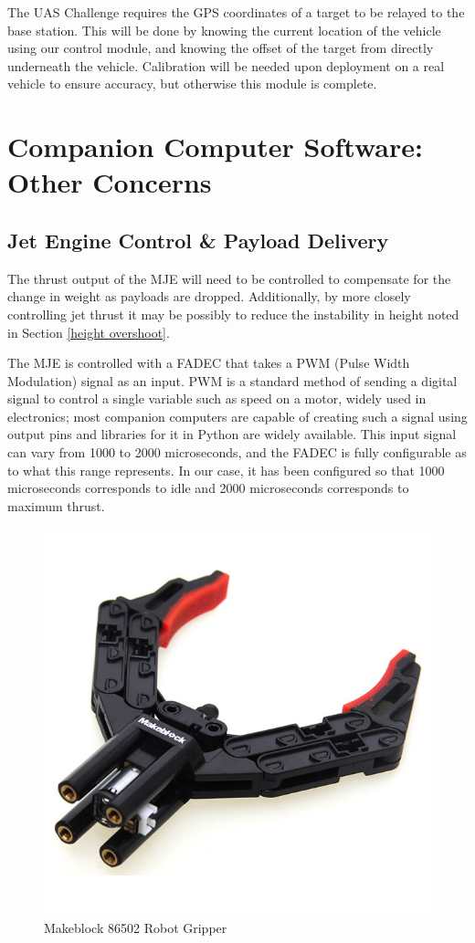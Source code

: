 \documentclass[11pt]{article}
\begin{document}
The UAS Challenge requires the GPS coordinates of a target to be relayed to the base station. This will be done by knowing the current location of the vehicle using our control module, and knowing the offset of the target from directly underneath the vehicle. Calibration will be needed upon deployment on a real vehicle to ensure accuracy, but otherwise this module is complete.

\section{Companion Computer Software: Other Concerns}
\subsection{Jet Engine Control \& Payload Delivery}
The thrust output of the MJE will need to be controlled to compensate for the change in weight as payloads are dropped. Additionally, by more closely controlling jet thrust it may be possibly to reduce the instability in height noted in Section \ref{height overshoot}.

The MJE is controlled with a FADEC that takes a PWM (Pulse Width Modulation) signal as an input. PWM is a standard method of sending a digital signal to control a single variable such as speed on a motor, widely used in electronics; most companion computers are capable of creating such a signal using output pins and libraries for it in Python are widely available. This input signal can vary from 1000 to 2000 microseconds, and the FADEC is fully configurable as to what this range represents. In our case, it has been configured so that 1000 microseconds corresponds to idle and 2000 microseconds corresponds to maximum thrust.

\begin{figure}
    \begin{center}
        \includegraphics[width=0.48\linewidth]{makeblock_gripper}
        \caption{Makeblock 86502 Robot Gripper}
        \label{fig:makeblock_gripper}
    \end{center}
\end{figure}
\end{document}
